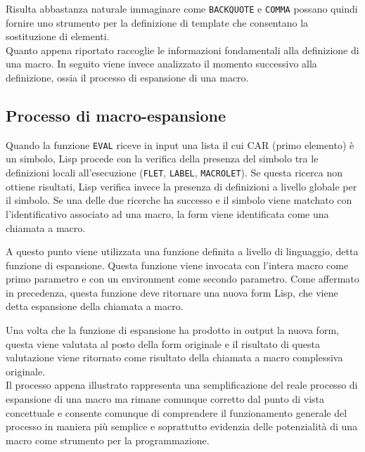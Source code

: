 Risulta abbastanza naturale immaginare come \texttt{BACKQUOTE} e
\texttt{COMMA} possano quindi fornire uno strumento per la definizione di
template che consentano la sostituzione di elementi.\\

Quanto appena riportato raccoglie le informazioni fondamentali alla
definizione di una macro. In seguito viene invece analizzato il momento
successivo alla definizione, ossia il processo di espansione di una macro.

\subsection{Processo di macro-espansione}
\label{macroexpansion}

Quando la funzione \texttt{EVAL} riceve in input una lista il cui CAR (primo
elemento) è un simbolo, Lisp procede con la verifica della presenza del
simbolo tra le definizioni locali all’esecuzione (\texttt{FLET},
\texttt{LABEL}, \texttt{MACROLET}). Se questa ricerca non ottiene risultati,
Lisp verifica invece la presenza di definizioni a livello globale per il
simbolo. Se una delle due ricerche ha successo e il simbolo viene matchato con
l’identificativo associato ad una macro, la form viene identificata come una
chiamata a macro.

A questo punto viene utilizzata una funzione definita a livello di linguaggio,
detta funzione di espansione. Questa funzione viene invocata con l’intera
macro come primo parametro e con un environment come secondo parametro. Come
affermato in precedenza, questa funzione deve ritornare una nuova form Lisp,
che viene detta espansione della chiamata a macro.

Una volta che la funzione di espansione ha prodotto in output la nuova form,
questa viene valutata al posto della form originale e il risultato di questa
valutazione viene ritornato come risultato della chiamata a macro complessiva
originale.\\


Il processo appena illustrato rappresenta una semplificazione del reale
processo di espansione di una macro ma rimane comunque corretto dal punto di
vista concettuale e consente comunque di comprendere il funzionamento generale
del processo in maniera più semplice e soprattutto evidenzia delle
potenzialità di una macro come strumento per la programmazione.\\

